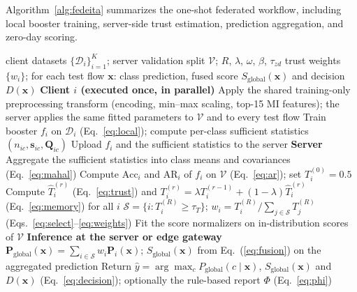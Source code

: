 \documentclass[pdflatex,sn-mathphys-num]{sn-jnl}
\begin{document}
{Algorithm~\ref{alg:fedeita} summarizes the one-shot federated workflow, including local booster training, server-side trust estimation, prediction aggregation, and zero-day scoring.

\begin{algorithm}[!htbp]\scriptsize
\color{black}
\caption{Fed-EITA: one-shot, prediction-level federated ensemble with trust weighting and zero-day scoring}\label{alg:fedeita}
\begin{algorithmic}[1]
\Require client datasets $\{\mathcal{D}_i\}_{i=1}^K$; server validation split $\mathcal{V}$; $R$, $\lambda$, $\omega$, $\beta$, $\tau_{zd}$
\Ensure trust weights $\{w_i\}$; for each test flow $\mathbf{x}$: class prediction, fused score $S_{\mathrm{global}}(\mathbf{x})$ and decision $D(\mathbf{x})$
\Statex \textbf{Client $i$ (executed once, in parallel)}
\State Apply the shared training-only preprocessing transform (encoding, min--max scaling, top-15 MI features); the server applies the same fitted parameters to $\mathcal{V}$ and to every test flow
\State Train booster $f_i$ on $\mathcal{D}_i$ (Eq.~\ref{eq:local}); compute per-class sufficient statistics $(n_{ic},\mathbf{s}_{ic},\mathbf{Q}_{ic})$
\State Upload $f_i$ and the sufficient statistics to the server
\Statex \textbf{Server}
\State Aggregate the sufficient statistics into class means and covariances (Eq.~\ref{eq:mahal})
  \State Compute $\mathrm{Acc}_i$ and $\mathrm{AR}_i$ of $f_i$ on $\mathcal{V}$ (Eq.~\ref{eq:ar}); set $T_i^{(0)}=0.5$
\EndFor
{} 
  \State Compute $\hat T_i^{(r)}$ (Eq.~\ref{eq:trust}) and $T_i^{(r)}=\lambda T_i^{(r-1)}+(1-\lambda)\hat T_i^{(r)}$ (Eq.~\ref{eq:memory}) for all $i$
\EndFor
\State $\mathcal{S}=\{i: T_i^{(R)}\geq\tau_T\}$; $w_i=T_i^{(R)}/\sum_{j\in\mathcal{S}}T_j^{(R)}$ (Eqs.~\ref{eq:select}--\ref{eq:weights})
\State Fit the score normalizers on in-distribution scores of $\mathcal{V}$
\Statex \textbf{Inference at the server or edge gateway}
\State $\mathbf{P}_{\mathrm{global}}(\mathbf{x})=\sum_{i\in\mathcal{S}}w_i\mathbf{P}_i(\mathbf{x})$; $S_{\mathrm{global}}(\mathbf{x})$ from Eq.~(\ref{eq:fusion}) on the aggregated prediction
\State Return $\hat y=\arg\max_c P_{\mathrm{global}}(c\mid\mathbf{x})$, $S_{\mathrm{global}}(\mathbf{x})$ and $D(\mathbf{x})$ (Eq.~\ref{eq:decision}); optionally the rule-based report $\Phi$ (Eq.~\ref{eq:phi})
\end{algorithmic}
\end{algorithm}
{\color{black}
}}
\end{document}
